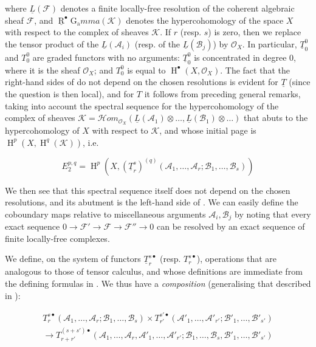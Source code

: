 where $\underline{L}(\mathcal{F})$ denotes a finite locally-free resolution of the coherent algebraic sheaf $\mathcal{F}$, and $\underline{\operatorname{R}}^\bullet\operatorname{G_a}mma(\mathcal{K})$ denotes the hypercohomology of the space $X$ with respect to the complex of sheaves $\mathcal{K}$.
If $r$ (resp. $s$) is zero, then we replace the tensor product of the $\underline{L}(\mathcal{A}_i)$ (resp. of the $\underline{L}(\mathcal{B}_j)$) by $\mathcal{O}_X$.
In particular, $\underline{T}_0^0$ and $T_0^0$ are graded functors with no arguments:
$\underline{T}_0^0$ is concentrated in degree $0$, where it is the sheaf $\mathcal{O}_X$;
and $T_0^0$ is equal to $\operatorname{H}^\bullet(X,\mathcal{O}_X)$.
The fact that the right-hand sides of  do not depend on the chosen resolutions is evident for $\underline{T}$ (since the question is then local), and for $T$ it follows from preceding general remarks, taking into account the spectral sequence for the hypercohomology of the complex of sheaves $\mathcal{K}=\mathcal{H}om_{\mathcal{O}_X}(\underline{L}(\mathcal{A}_1)\otimes\ldots,\underline{L}(\mathcal{B}_1)\otimes\ldots)$ that abuts to the hypercohomology of $X$ with respect to $\mathcal{K}$, and whose initial page is $\operatorname{H}^p(X,\operatorname{H}^q(\mathcal{K}))$, i.e.

\begin{equation}\tag{8.2}\label{fga1-equation-8.2}
  E_2^{p,q} = \operatorname{H}^p(X,(\underline{T}_r^s)^{(q)}(\mathcal{A}_1,\ldots,\mathcal{A}_r;\mathcal{B}_1,\ldots,\mathcal{B}_s))
\end{equation}

We then see that this spectral sequence itself does not depend on the chosen resolutions, and its abutment is the left-hand side of .
We can easily define the coboundary maps relative to miscellaneous arguments $\mathcal{A}_i,\mathcal{B}_j$ by noting that every exact sequence $0\to\mathcal{F}'\to\mathcal{F}\to\mathcal{F}''\to0$ can be resolved by an exact sequence of finite locally-free complexes.

We define, on the system of functors $\underline{T}_r^{s\bullet}$ (resp. $T_r^{s\bullet}$), operations that are analogous to those of tensor calculus, and whose definitions are immediate from the defining formulas in .
We thus have a \emph{composition} (generalising that described in ):

\begin{equation}\tag{8.3}\label{fga1-equation-8.3}
  \begin{aligned}
    T_r^{s\bullet}(\mathcal{A}_1,\ldots,\mathcal{A}_r;\mathcal{B}_1,\ldots,\mathcal{B}_s)
    \times T_{r'}^{s'\bullet}(\mathcal{A}'_1,\ldots,\mathcal{A}'_{r'};\mathcal{B}'_1,\ldots,\mathcal{B}'_{s'})
    \\\to T_{r+r'}^{(s+s')\bullet}(\mathcal{A}_1,\ldots,\mathcal{A}_r,\mathcal{A}'_1,\ldots,\mathcal{A}'_{r'};\mathcal{B}_1,\ldots,\mathcal{B}_s,\mathcal{B}'_1,\ldots,\mathcal{B}'_{s'})
  \end{aligned}
\end{equation}


